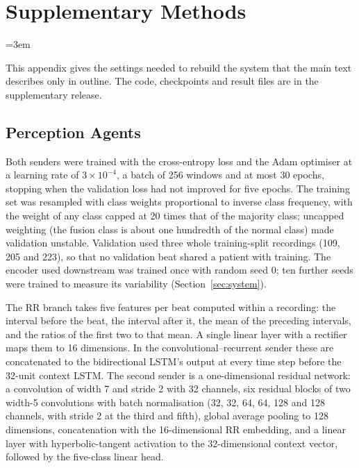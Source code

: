\appendix
\section{Supplementary Methods}
\label{app:methods}
\emergencystretch=3em

This appendix gives the settings needed to rebuild the system that the main text describes only in outline. The code, checkpoints and result files are in the supplementary release.

\subsection{Perception Agents}
Both senders were trained with the cross-entropy loss and the Adam optimiser at a learning rate of $3\times10^{-4}$, a batch of 256 windows and at most 30 epochs, stopping when the validation loss had not improved for five epochs. The training set was resampled with class weights proportional to inverse class frequency, with the weight of any class capped at 20 times that of the majority class; uncapped weighting (the fusion class is about one hundredth of the normal class) made validation unstable. Validation used three whole training-split recordings (109, 205 and 223), so that no validation beat shared a patient with training. The encoder used downstream was trained once with random seed 0; ten further seeds were trained to measure its variability (Section~\ref{sec:system}).

The RR branch takes five features per beat computed within a recording: the interval before the beat, the interval after it, the mean of the preceding intervals, and the ratios of the first two to that mean. A single linear layer with a rectifier maps them to 16 dimensions. In the convolutional--recurrent sender these are concatenated to the bidirectional LSTM's output at every time step before the 32-unit context LSTM. The second sender is a one-dimensional residual network: a convolution of width 7 and stride 2 with 32 channels, six residual blocks of two width-5 convolutions with batch normalisation (32, 32, 64, 64, 128 and 128 channels, with stride 2 at the third and fifth), global average pooling to 128 dimensions, concatenation with the 16-dimensional RR embedding, and a linear layer with hyperbolic-tangent activation to the 32-dimensional context vector, followed by the five-class linear head.

